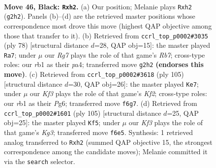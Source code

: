\documentclass[11pt]{article}
\begin{document}
\clearpage

\begin{figure}[p]\centering
\begin{subfigure}{0.46\textwidth}\centering
\resizebox{\linewidth}{!}{%
\newchessgame
\chessboard[
  setfen={8/1R3p2/p3pk2/8/P3P2K/5P1P/6rP/1R6 b - - 0 46},
  showmover=false,
  pgfstyle=straightmove, color=movearrow, markmove={g2-h2}
]}
\caption{}
\end{subfigure}\hfill
\begin{subfigure}{0.46\textwidth}\centering
\resizebox{\linewidth}{!}{%
\newchessgame
\chessboard[
  setfen={5k2/1R3p2/6pp/4P3/p4PK1/r5P1/7P/8 w - - 0 40},
  showmover=false,
  pgfstyle=straightmove, color=movearrow, markmove={b7-a7}
]}
\caption{}
\end{subfigure}
\\[4pt]
\begin{subfigure}{0.46\textwidth}\centering
\resizebox{\linewidth}{!}{%
\newchessgame
\chessboard[
  setfen={8/5k2/2p2pp1/7p/P1RK3P/r2P2P1/8/8 b - - 5 53},
  showmover=false,
  pgfstyle=straightmove, color=movearrow, markmove={f7-e7}
]}
\caption{}
\end{subfigure}\hfill
\begin{subfigure}{0.46\textwidth}\centering
\resizebox{\linewidth}{!}{%
\newchessgame
\chessboard[
  setfen={8/8/5pkp/8/pR1K1P1P/P4P2/1P2r3/8 b - - 0 53},
  showmover=false,
  pgfstyle=straightmove, color=movearrow, markmove={g6-f5}
]}
\caption{}
\end{subfigure}
\caption{\textbf{Move 46, Black: \texttt{Rxh2}.} (a) Our position; Melanie plays \texttt{Rxh2} (\texttt{g2h2}). Panels (b)--(d) are the retrieved master positions whose correspondence most drove this move (highest QAP objective among those that transfer to it). (b) Retrieved from \texttt{ccrl\_top\_p0002\#3035} (ply 78) [structural distance $d$=28, QAP obj=15]: the master played \texttt{Ra7}; under $\mu$ our \emph{Rg7} plays the role of that game's \emph{Rb7}; cross-type roles: our \emph{r}b1 as their \emph{p}a4; transferred move \texttt{g2h2} \textbf{(endorses this move)}. (c) Retrieved from \texttt{ccrl\_top\_p0002\#3618} (ply 105) [structural distance $d$=30, QAP obj=26]: the master played \texttt{Ke7}; under $\mu$ our \emph{Kf3} plays the role of that game's \emph{Kf2}; cross-type roles: our \emph{r}b1 as their \emph{P}g6; transferred move \texttt{f6g7}. (d) Retrieved from \texttt{ccrl\_top\_p0002\#1601} (ply 105) [structural distance $d$=25, QAP obj=25]: the master played \texttt{Kf5}; under $\mu$ our \emph{Kf3} plays the role of that game's \emph{Kg3}; transferred move \texttt{f6e5}. Synthesis: 1 retrieved analog transferred to \texttt{Rxh2} (summed QAP objective 15, the strongest correspondence among the candidate moves); Melanie committed it via the \texttt{search} selector.}
\label{fig:thought-m91}
\end{figure}
\end{document}
